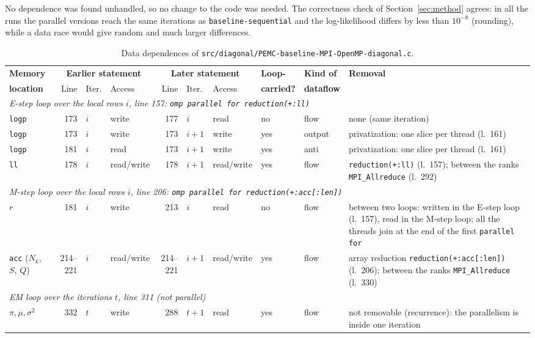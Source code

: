 \documentclass[conference,onecolumn]{IEEEtran}
\newcommand{\vseq}{\texttt{baseline-\allowbreak sequential}}
\begin{document}
No dependence was found unhandled, so no change to the code was needed. The correctness check of Section~\ref{sec:method} agrees: in all the runs the parallel versions reach the same iterations as \vseq{} and the log-likelihood differs by less than $10^{-8}$ (rounding), while a data race would give random and much larger differences.

\begin{table}[H]
\centering
\caption{Data dependences of \texttt{src/diagonal/PEMC-baseline-MPI-OpenMP-diagonal.c}.}\label{tab:dep-base-diag}
\scriptsize
\setlength{\tabcolsep}{3pt}
\begin{tabular}{lrllrllllp{}}
\toprule
\textbf{Memory} & \multicolumn{3}{c}{\textbf{Earlier statement}} & \multicolumn{3}{c}{\textbf{Later statement}} & \textbf{Loop-} & \textbf{Kind of} & \textbf{Removal} \\
\cmidrule(lr){2-4} \cmidrule(lr){5-7}
\textbf{location} & Line & Iter. & Access & Line & Iter. & Access & \textbf{carried?} & \textbf{dataflow} & \\
\midrule
\multicolumn{10}{p{0.92\textwidth}}{\emph{E-step loop over the local rows $i$, line 157: \texttt{omp parallel for reduction(+:ll)}}} \\
\texttt{logp} & 173 & $i$ & write & 177 & $i$ & read & no & flow & none (same iteration) \\
\texttt{logp} & 173 & $i$ & write & 173 & $i+1$ & write & yes & output & privatization: one slice per thread (l.~161) \\
\texttt{logp} & 181 & $i$ & read & 173 & $i+1$ & write & yes & anti & privatization: one slice per thread (l.~161) \\
\texttt{ll} & 178 & $i$ & read/write & 178 & $i+1$ & read/write & yes & flow & \texttt{reduction(+:ll)} (l.~157); between the ranks \texttt{MPI\_Allreduce} (l.~292) \\
\midrule
\multicolumn{10}{p{0.92\textwidth}}{\emph{M-step loop over the local rows $i$, line 206: \texttt{omp parallel for reduction(+:acc[:len])}}} \\
$r$ & 181 & $i$ & write & 213 & $i$ & read & no & flow & between two loops: written in the E-step loop (l.~157), read in the M-step loop; all the threads join at the end of the first \texttt{parallel for} \\
\texttt{acc} ($N_k$, $S$, $Q$) & 214--221 & $i$ & read/write & 214--221 & $i+1$ & read/write & yes & flow & array reduction \texttt{reduction(+:acc[:len])} (l.~206); between the ranks \texttt{MPI\_Allreduce} (l.~330) \\
\midrule
\multicolumn{10}{p{0.92\textwidth}}{\emph{EM loop over the iterations $t$, line 311 (not parallel)}} \\
$\pi,\mu,\sigma^2$ & 332 & $t$ & write & 288 & $t+1$ & read & yes & flow & not removable (recurrence): the parallelism is inside one iteration \\
\bottomrule
\end{tabular}
\end{table}
\end{document}
